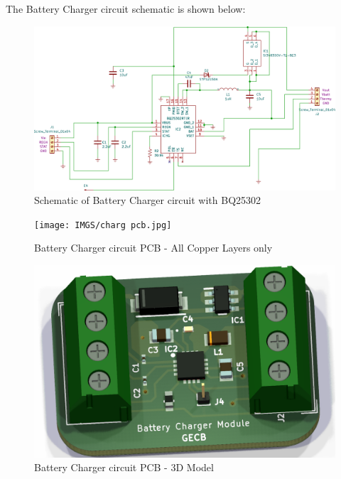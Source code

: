 The Battery Charger circuit schematic is shown below:
\begin{figure}[H]
	\centering
	\includegraphics[width=\columnwidth]{IMGS/charg.pdf}
	\caption{Schematic of Battery Charger circuit with BQ25302}
	\label{fig:battch}
\end{figure}

  \begin{figure}[H]
	\centering
	\texttt{[image: IMGS/charg pcb.jpg]}
	\caption{\centering Battery Charger circuit PCB - All Copper Layers only}
	\label{fig:chargpcb}
\end{figure}
\begin{figure}[H]
	\centering	\includegraphics[width=0.7\columnwidth]{IMGS/charg 3d.png}
	\caption{\centering Battery Charger circuit PCB - 3D Model}
	\label{fig:chargpcb3d}
\end{figure}

\pagebreak \justifying








